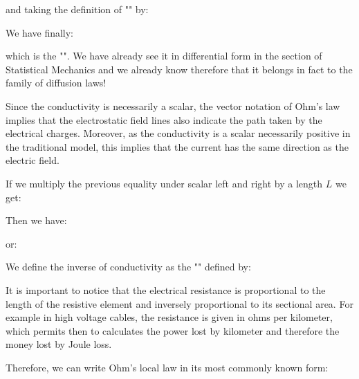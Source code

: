 	and taking the definition of "" by:
	
	We have finally:
	
	which is the "". We have already see it in differential form in the section of Statistical Mechanics and we already know therefore that it belongs in fact to the family of diffusion laws!
	\begin{tcolorbox}[title=Remark,colframe=black,arc=10pt]
	Since the conductivity is necessarily a scalar, the vector notation of Ohm's law implies that the electrostatic field lines also indicate the path taken by the electrical charges. Moreover, as the conductivity is a scalar necessarily positive in the traditional model, this implies that the current has the same direction as the electric field.
	\end{tcolorbox}	
	If we multiply the previous equality under scalar left and right by a length $L$ we get:
	
	Then we have:
	
	or:
	
	We define the inverse of conductivity as the "" defined by:
	
	\begin{tcolorbox}[title=Remark,colframe=black,arc=10pt]
	It is important to notice that the electrical resistance is proportional to the length of the resistive element and inversely proportional to its sectional area. For example in high voltage cables, the resistance is given in ohms per kilometer, which permits then to calculates the power lost by kilometer and therefore the money lost by Joule loss.
	\end{tcolorbox}	
	Therefore, we can write Ohm's local law in its most commonly known form:
	
